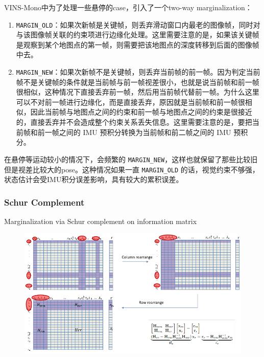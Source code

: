 \documentclass[12pt,a4paper]{article}
\begin{document}
VINS-Mono中为了处理一些悬停的case，引入了一个two-way marginalization：

\begin{enumerate}
\item \verb|MARGIN_OLD|：如果次新帧是关键帧，则丢弃滑动窗口内最老的图像帧，同时对与该图像帧关联的约束项进行边缘化处理。这里需要注意的是，如果该关键帧是观察到某个地图点的第一帧，则需要把该地图点的深度转移到后面的图像帧中去。

\item \verb|MARGIN_NEW|：如果次新帧不是关键帧，则丢弃当前帧的前一帧。因为判定当前帧不是关键帧的条件就是当前帧与前一帧视差很小，也就是说当前帧和前一帧很相似，这种情况下直接丢弃前一帧，然后用当前帧代替前一帧。为什么这里可以不对前一帧进行边缘化，而是直接丢弃，原因就是当前帧和前一帧很相似，因此当前帧与地图点之间的约束和前一帧与地图点之间的约束是很接近的，直接丢弃并不会造成整个约束关系丢失信息。这里需要注意的是，要把当前帧和前一帧之间的 IMU 预积分转换为当前帧和前二帧之间的 IMU 预积分。

\end{enumerate}

在悬停等运动较小的情况下，会频繁的 \verb|MARGIN_NEW|，这样也就保留了那些比较旧但是视差比较大的pose。这种情况如果一直 \verb|MARGIN_OLD| 的话，视觉约束不够强，状态估计会受IMU积分误差影响，具有较大的累积误差。

\subsubsection{Schur Complement}

Marginalization via Schur complement on information matrix

\begin{figure}[htbp]
\centering
\includegraphics[scale=0.5]{images/schur_complement.png}
\end{figure}
\end{document}
